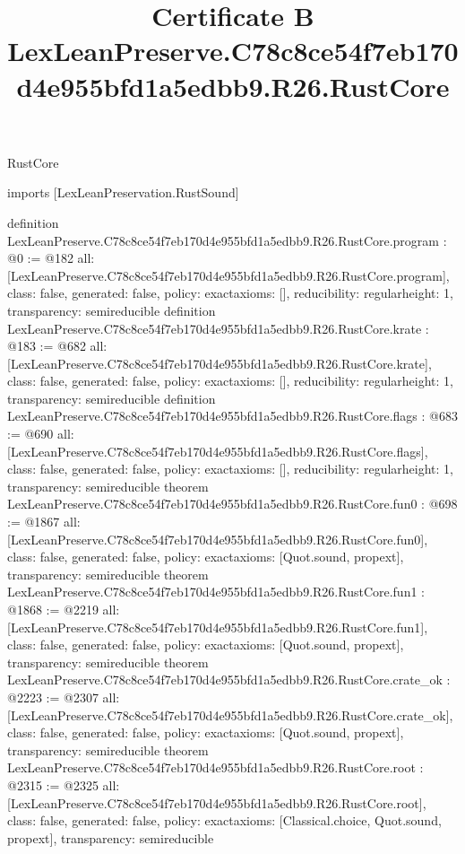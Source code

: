 \begin{lexlean}{RustCore}
\title{Certificate B LexLeanPreserve.C78c8ce54f7eb170d4e955bfd1a5edbb9.R26.RustCore}
\begin{coremodule}
imports [LexLeanPreservation.RustSound]

definition LexLeanPreserve.C78c8ce54f7eb170d4e955bfd1a5edbb9.R26.RustCore.program : @0 := @182 {
  all: [LexLeanPreserve.C78c8ce54f7eb170d4e955bfd1a5edbb9.R26.RustCore.program],
  class: false,
  generated: false,
  policy: exact{axioms: []},
  reducibility: regular{height: 1},
  transparency: semireducible
}
definition LexLeanPreserve.C78c8ce54f7eb170d4e955bfd1a5edbb9.R26.RustCore.krate : @183 := @682 {
  all: [LexLeanPreserve.C78c8ce54f7eb170d4e955bfd1a5edbb9.R26.RustCore.krate],
  class: false,
  generated: false,
  policy: exact{axioms: []},
  reducibility: regular{height: 1},
  transparency: semireducible
}
definition LexLeanPreserve.C78c8ce54f7eb170d4e955bfd1a5edbb9.R26.RustCore.flags : @683 := @690 {
  all: [LexLeanPreserve.C78c8ce54f7eb170d4e955bfd1a5edbb9.R26.RustCore.flags],
  class: false,
  generated: false,
  policy: exact{axioms: []},
  reducibility: regular{height: 1},
  transparency: semireducible
}
theorem LexLeanPreserve.C78c8ce54f7eb170d4e955bfd1a5edbb9.R26.RustCore.fun0 : @698 := @1867 {
  all: [LexLeanPreserve.C78c8ce54f7eb170d4e955bfd1a5edbb9.R26.RustCore.fun0],
  class: false,
  generated: false,
  policy: exact{axioms: [Quot.sound, propext]},
  transparency: semireducible
}
theorem LexLeanPreserve.C78c8ce54f7eb170d4e955bfd1a5edbb9.R26.RustCore.fun1 : @1868 := @2219 {
  all: [LexLeanPreserve.C78c8ce54f7eb170d4e955bfd1a5edbb9.R26.RustCore.fun1],
  class: false,
  generated: false,
  policy: exact{axioms: [Quot.sound, propext]},
  transparency: semireducible
}
theorem LexLeanPreserve.C78c8ce54f7eb170d4e955bfd1a5edbb9.R26.RustCore.crate_ok : @2223 := @2307 {
  all: [LexLeanPreserve.C78c8ce54f7eb170d4e955bfd1a5edbb9.R26.RustCore.crate_ok],
  class: false,
  generated: false,
  policy: exact{axioms: [Quot.sound, propext]},
  transparency: semireducible
}
theorem LexLeanPreserve.C78c8ce54f7eb170d4e955bfd1a5edbb9.R26.RustCore.root : @2315 := @2325 {
  all: [LexLeanPreserve.C78c8ce54f7eb170d4e955bfd1a5edbb9.R26.RustCore.root],
  class: false,
  generated: false,
  policy: exact{axioms: [Classical.choice, Quot.sound, propext]},
  transparency: semireducible
}


\end{coremodule}
\end{lexlean}
